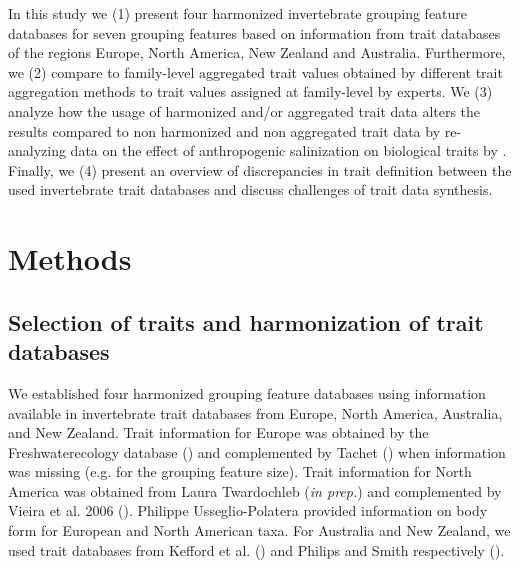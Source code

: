 \documentclass{article}
\begin{document}

In this study we (1) present four harmonized invertebrate grouping feature databases for seven grouping features based on information from trait databases of the regions Europe, North America, New Zealand and Australia. %
Furthermore, we (2) compare to family-level aggregated trait values obtained by different trait aggregation methods to trait values assigned at family-level by experts. We (3) analyze how the usage of harmonized and/or aggregated trait data alters the results compared to non harmonized and non aggregated trait data by re-analyzing data on the effect of anthropogenic salinization on biological traits by \cite{szocs_effects_2014}. Finally, we (4) present an overview of discrepancies in trait definition between the used invertebrate trait databases and discuss challenges of trait data synthesis.


\section*{Methods}

\subsection*{Selection of traits and harmonization of trait databases}


We established four harmonized grouping feature databases using information available in invertebrate trait databases from Europe, North America, Australia, and New Zealand. Trait information for Europe was obtained by the Freshwaterecology database (\cite{schmidt-kloiber_www.freshwaterecology.info_2015}) and complemented by Tachet (\cite{usseglio-polatera_biomonitoring_2000}) when information was missing (e.g. for the grouping feature size). Trait information for North America was obtained from Laura Twardochleb (\textit{in prep.}) and complemented by Vieira et al. 2006 (\cite{vieira_database_nodate}). Philippe Usseglio-Polatera provided information on body form for European and North American taxa. For Australia and New Zealand, we used trait databases from Kefford et al. (\cite{kefford_integrated_2020}) and Philips and Smith respectively (\cite{Philips_and_Smith_NZ_DB_2018}).
\end{document}
